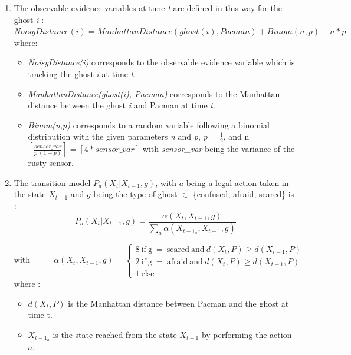 \documentclass{article}
\newcommand\round[1]{\left[#1\right]}
\begin{document}
\begin{enumerate}[label=\alph*.,leftmargin=*]
    \item The observable evidence variables at time \textit{t} are defined in
    this way for the ghost \textit{i} : \\
    
    $NoisyDistance(i) = 
    ManhattanDistance(ghost(i), Pacman) + Binom(n, p) - n * p$ \\

    where:
    \begin{itemize}
    	\item \textit{NoisyDistance(i)} corresponds to the observable evidence variable 
    which is tracking the ghost \textit{i} at time \textit{t}.
    	\item \textit{ManhattanDistance(ghost(i), Pacman)} corresponds to the Manhattan distance between the ghost \textit{i} and Pacman at time \textit{t}.
    	\item \textit{Binom(n,p)} corresponds to a random variable following a binomial distribution with the given parameters
    \textit{n} and \textit{p}, \textit{p} = $\frac{1}{2}$, and n = $\round{\frac{sensor\_var}{p \ (1 - p)}} = \round{4 * sensor\_var}$ with \textit{sensor\_var} being the variance of the rusty sensor.
    \end{itemize}
    
    \item The transition model $P_a(X_t | X_{t-1}, g)$, with $a$ being a legal action taken in the state $X_{t-1}$ and $g$ being the type of ghost $\in$ \{confused, afraid, scared\} is :
    \[
  P_a(X_t | X_{t-1}, g) = \frac{\alpha(X_t, X_{t-1}, g)}{{\sum_{a} {\alpha(X_{t-1_a}, X_{t-1}, g)}}}
\]

\[
\text{with} \ \ \ \ \ \ \ \ \ \ \ \ \ \alpha(X_t, X_{t-1}, g) = 
  \begin{cases}
        \text{8} \ \text{if} \ \text{g} \ = \ \text{scared} \ \text{and} \ d(X_t, P)  \geq  d(X_{t-1}, P)\\
        \text{2} \ \text{if} \ \text{g} \ = \ \text{afraid} \ \text{and} \ d(X_t, P)  \geq  d(X_{t-1}, P)\\
        \text{1} \ \text{else}
  \end{cases}
\]
where :
\begin{itemize}
    \item $d(X_t, P)$ is the Manhattan distance between Pacman and the ghost at time t.
    \item $X_{t-1_a}$ is the state reached from the state $X_{t-1}$ by performing the action $a$.
\end{itemize}
	

\end{enumerate}
\end{document}
